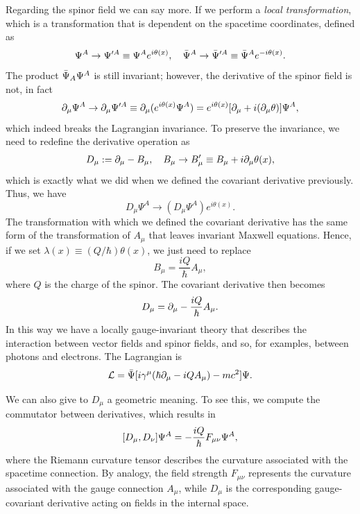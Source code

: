 Regarding the spinor field we can say more. If we perform a \emph{local transformation}, which is a transformation that is dependent on the spacetime coordinates, defined as 
\begin{equation}
    \Psi^A \to \Psi^{\prime A} \equiv \Psi^Ae^{i\theta(x)},\quad \bar{\Psi}^A \to \bar{\Psi}^{\prime A} \equiv \bar{\Psi}^Ae^{-i\theta(x)}.
\end{equation}
The product $\bar{\Psi}_A\Psi^A$ is still invariant; however, the derivative of the spinor field is not, in fact 
\begin{equation}
    \partial_\mu \Psi^A \to \partial_\mu\Psi^{\prime A} \equiv \partial_\mu(e^{i\theta(x)}\Psi^A) = e^{i\theta(x)}[\partial_\mu + i(\partial_\mu\theta)]\Psi^A,
\end{equation}
which indeed breaks the Lagrangian invariance. To preserve the invariance, we need to redefine the derivative operation as 
\begin{eqnarray}
    D_\mu := \partial_\mu - B_\mu,\quad B_\mu \to B_\mu' \equiv B_\mu + i\partial_\mu\theta(x),
\end{eqnarray}
which is exactly what we did when we defined the covariant derivative previously. Thus, we have 
\begin{equation}
    D_\mu\Psi^A \to (D_\mu\Psi^A)e^{i\theta(x)}.
\end{equation}
The transformation with which we defined the covariant derivative has the same form of the transformation of $A_\mu$ that leaves invariant Maxwell equations. Hence, if we set $\lambda(x) \equiv (Q/\hbar)\theta(x)$, we just need to replace
\begin{equation}
    B_\mu = \frac{iQ}{\hbar}A_\mu,
\end{equation}
where $Q$ is the charge of the spinor. The covariant derivative then becomes 
\begin{equation}
    D_\mu = \partial_\mu - \frac{iQ}{\hbar}A_\mu.
\end{equation}
In this way we have a locally gauge-invariant theory that describes the interaction between vector fields and spinor fields, and so, for examples, between photons and electrons. The Lagrangian is 
\begin{equation}
    \mathcal{L} = \bar{\Psi}[i\gamma^\mu(\hbar\partial_\mu - iQA_\mu) - mc^2]\Psi.
\end{equation}

We can also give to $D_{\mu}$ a geometric meaning. To see this, we compute the commutator between derivatives, which results in
\begin{equation}
    [D_\mu,D_\nu]\Psi^A = -\frac{iQ}{\hbar}F_{\mu\nu}\Psi^A,
\end{equation}
where the Riemann curvature tensor describes the curvature associated with the spacetime connection. By analogy, the field strength $F_{\mu\nu}$ represents the curvature associated with the gauge connection $A_{\mu}$, while $D_{\mu}$ is the corresponding gauge-covariant derivative acting on fields in the internal space.

